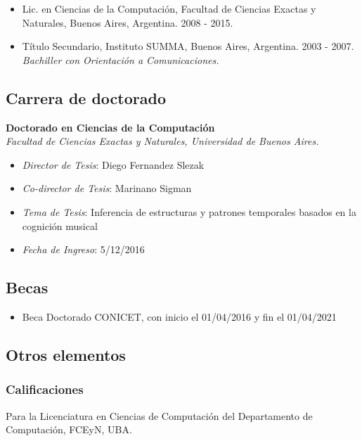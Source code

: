 \documentclass[a4paper,10pt]{article}
\begin{document}
\begin{itemize}
    \item {Lic. en Ciencias de la Computación, Facultad de Ciencias Exactas y
        Naturales, Buenos Aires, Argentina. 2008 - 2015.}
    \item {Título Secundario, Instituto SUMMA, Buenos Aires, Argentina. 2003
            - 2007. \\
        {\small \itshape Bachiller con Orientación a Comunicaciones.}}
\end{itemize}

\subsection{Carrera de doctorado}

\textbf{Doctorado en Ciencias de la Computación}\\
\indent{}\emph{Facultad de Ciencias Exactas y Naturales, Universidad de Buenos Aires.}
\begin{itemize}
    \item \emph{Director de Tesis}: Diego Fernandez Slezak
    \item \emph{Co-director de Tesis}: Marinano Sigman
    \item \emph{Tema de Tesis}: Inferencia de estructuras y patrones temporales
        basados en la cognición musical
    \item \emph{Fecha de Ingreso}: 5/12/2016
\end{itemize}

\subsection{Becas}

\begin{itemize}
    \item Beca Doctorado CONICET, con inicio el 01/04/2016 y fin el 01/04/2021
\end{itemize}

\subsection{Otros elementos}

\subsubsection{Calificaciones}

Para la Licenciatura en Ciencias de Computación del Departamento de
Computación, FCEyN, UBA.
\end{document}
